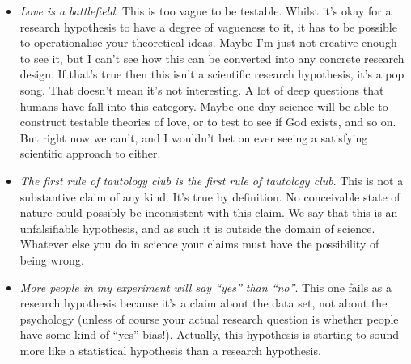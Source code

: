 \begin{itemize}
\item {\it Love is a battlefield}. This is too vague to be testable. Whilst it's okay for a research hypothesis to have a degree of vagueness to it, it has to be possible to operationalise your theoretical ideas. Maybe I'm just not creative enough to see it, but I can't see how this can be converted into any concrete research design. If that's true then this isn't a scientific research hypothesis, it's a pop song. That doesn't mean it's not interesting. A lot of deep questions that humans have fall into this category. Maybe one day science will be able to construct testable theories of love, or to test to see if God exists, and so on. But right now we can't, and I wouldn't bet on ever seeing a satisfying scientific approach to either. 
\item {\it The first rule of tautology club is the first rule of tautology club}. This is not a substantive claim of any kind. It's true by definition. No conceivable state of nature could possibly be inconsistent with this claim. We say that this is an unfalsifiable hypothesis, and as such it is outside the domain of science. Whatever else you do in science your claims must have the possibility of being wrong. 
\item {\it More people in my experiment will say ``yes'' than ``no''}. This one fails as a research hypothesis because it's a claim about the data set, not about the psychology (unless of course your actual research question is whether people have some kind of ``yes'' bias!). Actually, this hypothesis is starting to sound more like a statistical hypothesis than a research hypothesis. 
\end{itemize}

